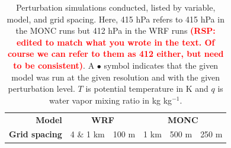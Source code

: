 \documentclass[draft]{agujournal2019}
\newcommand{\todo}[1]{\textcolor{red}{\textbf{(#1)}}}
\begin{document}
{
\begin{table}
    \centering
    \caption{Perturbation simulations conducted, listed by variable, model, and grid spacing. Here,
    415 hPa refers to 415 hPa in the MONC runs but 412 hPa in the WRF runs \todo{RSP: edited to match what you wrote in the text. Of course we can refer to them as 412 either, but need to be consistent}. A
    $\bullet{}$ symbol indicates that the given model was run at the given
    resolution and with the given perturbation level. $T$ is potential temperature in K and
    $q$ is water vapor mixing ratio in kg kg$^{-1}$.}
    \label{tab:pert_runs}
    \renewcommand{\arraystretch}{0.6}
    \footnotesize
    \begin{tabular}{llrccccc}
        \multicolumn{3}{r}{\textbf{Model}} & \multicolumn{2}{c}{\textbf{WRF}} & \multicolumn{3}{c}{\textbf{MONC}} \\
        \multicolumn{3}{r}{\textbf{Grid spacing}} & 4 \& 1 km & 100 m & 1 km & 500 m & 250 m \\
        

\end{tabular}
\end{table}}
\end{document}

